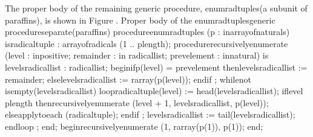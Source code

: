 \Para[]The proper body of the remaining generic procedure, %
\tyxffmxmono[]enum\Symuns[]rad\Symuns[]tuples\tyxffmxendmono[] (a
subunit of \tyxffmxmono[]paraffins\tyxffmxendmono[]), is shown in
Figure .
\FgBlock[]
\Parbox[]
Proper body of the %
\tyxffmxmono[]enum\Symuns[]rad\Symuns[]tuples\tyxffmxendmono[] generic
procedure\FgEndcap[]
\Comp[]\tyxtstxbf[]separate\tyxtstxendbf[] (paraffins)
\tyxtstxbf[]procedure\tyxtstxendbf[] enum\Symuns[]rad\Symuns[]tuples (p : %
\tyxtstxbf[]in\tyxtstxendbf[] array\Symuns[]of\Symuns[]naturals) %
\tyxtstxbf[]is\tyxtstxendbf[]
   radical\Symuns[]tuple : array\Symuns[]of\Symuns[]radicals (1 .. p\rsquo[]length);
   \tyxtstxbf[]procedure\tyxtstxendbf[] recursively\Symuns[]enumerate (level        : %
\tyxtstxbf[]in\tyxtstxendbf[] positive;
                                    remainder    : \tyxtstxbf[]in%
\tyxtstxendbf[] radical\Symuns[]list;
                                    prev\Symuns[]element : %
\tyxtstxbf[]in\tyxtstxendbf[] natural) \tyxtstxbf[]is%
\tyxtstxendbf[]
      levels\Symuns[]radical\Symuns[]list : radical\Symuns[]list;
   \tyxtstxbf[]begin\tyxtstxendbf[]
      \tyxtstxbf[]if\tyxtstxendbf[] p(level) = prev\Symuns[]element %
\tyxtstxbf[]then\tyxtstxendbf[]
         levels\Symuns[]radical\Symuns[]list := remainder;
      \tyxtstxbf[]else\tyxtstxendbf[]
         levels\Symuns[]radical\Symuns[]list := r\Symuns[]array(p(level));
      \tyxtstxbf[]end\tyxtstxendbf[] \tyxtstxbf[]if%
\tyxtstxendbf[];
      \tyxtstxbf[]while\tyxtstxendbf[] \tyxtstxbf[]not%
\tyxtstxendbf[] is\Symuns[]empty(levels\Symuns[]radical\Symuns[]list) %
\tyxtstxbf[]loop\tyxtstxendbf[]
         radical\Symuns[]tuple(level) := head(levels\Symuns[]radical\Symuns[]list);
         \tyxtstxbf[]if\tyxtstxendbf[] level \Symlt[] p\rsquo[]length %
\tyxtstxbf[]then\tyxtstxendbf[]
            recursively\Symuns[]enumerate (level + 1,
                                   levels\Symuns[]radical\Symuns[]list,
                                   p(level));
         \tyxtstxbf[]else\tyxtstxendbf[]
            apply\Symuns[]to\Symuns[]each (radical\Symuns[]tuple);
         \tyxtstxbf[]end\tyxtstxendbf[] \tyxtstxbf[]if%
\tyxtstxendbf[];
         levels\Symuns[]radical\Symuns[]list := tail(levels\Symuns[]radical\Symuns[]list);
      \tyxtstxbf[]end\tyxtstxendbf[] \tyxtstxbf[]loop%
\tyxtstxendbf[];
   \tyxtstxbf[]end\tyxtstxendbf[];
\tyxtstxbf[]begin\tyxtstxendbf[]
   recursively\Symuns[]enumerate (1, r\Symuns[]array(p(1)), p(1));
\tyxtstxbf[]end\tyxtstxendbf[];\Endcomp[]
\EndParbox[]

